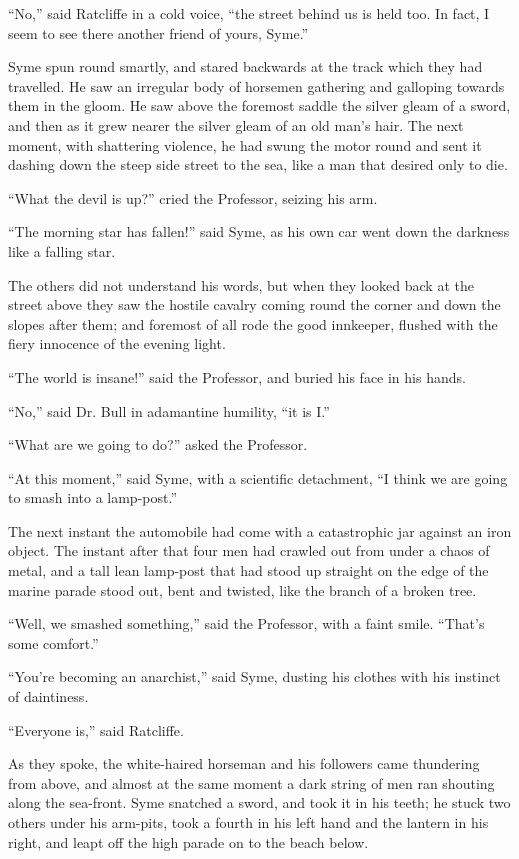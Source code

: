 \documentclass{book}
\begin{document}
“No,” said Ratcliffe in a cold voice, “the street behind us is held too. In fact, I seem to see there another friend of yours, Syme.”

Syme spun round smartly, and stared backwards at the track which they had travelled. He saw an irregular body of horsemen gathering and galloping towards them in the gloom. He saw above the foremost saddle the silver gleam of a sword, and then as it grew nearer the silver gleam of an old man’s hair. The next moment, with shattering violence, he had swung the motor round and sent it dashing down the steep side street to the sea, like a man that desired only to die.

“What the devil is up?” cried the Professor, seizing his arm.

“The morning star has fallen!” said Syme, as his own car went down the darkness like a falling star.

The others did not understand his words, but when they looked back at the street above they saw the hostile cavalry coming round the corner and down the slopes after them; and foremost of all rode the good innkeeper, flushed with the fiery innocence of the evening light.

“The world is insane!” said the Professor, and buried his face in his hands.

“No,” said Dr. Bull in adamantine humility, “it is I.”

“What are we going to do?” asked the Professor.

“At this moment,” said Syme, with a scientific detachment, “I think we are going to smash into a lamp-post.”

The next instant the automobile had come with a catastrophic jar against an iron object. The instant after that four men had crawled out from under a chaos of metal, and a tall lean lamp-post that had stood up straight on the edge of the marine parade stood out, bent and twisted, like the branch of a broken tree.

“Well, we smashed something,” said the Professor, with a faint smile. “That’s some comfort.”

“You’re becoming an anarchist,” said Syme, dusting his clothes with his instinct of daintiness.

“Everyone is,” said Ratcliffe.

As they spoke, the white-haired horseman and his followers came thundering from above, and almost at the same moment a dark string of men ran shouting along the sea-front. Syme snatched a sword, and took it in his teeth; he stuck two others under his arm-pits, took a fourth in his left hand and the lantern in his right, and leapt off the high parade on to the beach below.
\end{document}
